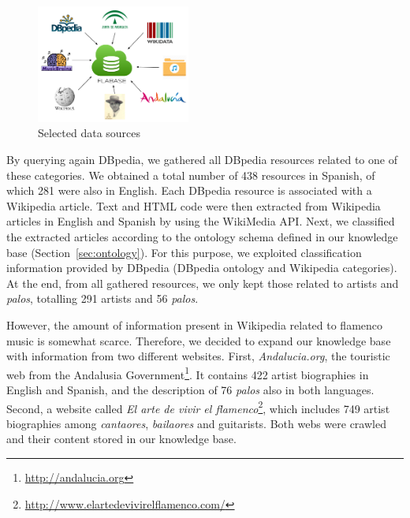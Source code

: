\begin{figure}
	\centering
	\includegraphics[width=0.45\textwidth]{ch08_musicology/pics/datasources.png}
	\caption{Selected data sources \label{fig:datasources}}
\end{figure}

By querying again DBpedia, we gathered all DBpedia resources related to one of these categories. We obtained a total number of 438 resources in Spanish, of which 281 were also in English. Each DBpedia resource is associated with a Wikipedia article. Text and HTML code were then extracted from Wikipedia articles in English and Spanish by using the WikiMedia API. 
Next, we classified the extracted articles according to the ontology schema defined in our knowledge base (Section~\ref{sec:ontology}). For this purpose, we exploited classification information provided by DBpedia (DBpedia ontology and Wikipedia categories). At the end, from all gathered resources, we only kept those related to artists and \textit{palos}, totalling  291 artists and 56 \textit{palos}.

However, the amount of information present in Wikipedia related to flamenco music is somewhat scarce. Therefore, we decided to expand our knowledge base with information from two different websites. First, \textit{Andalucia.org}, the touristic web from the Andalusia Government\footnote{\url{http://andalucia.org}}. It contains 422 artist biographies in English and Spanish, and the description of 76 \textit{palos} also in both languages. Second, a website called \textit{El arte de vivir el flamenco}\footnote{\url{http://www.elartedevivirelflamenco.com/}}, which includes 749 artist biographies among \textit{cantaores}, \textit{bailaores} and guitarists. Both webs were crawled and their content stored in our knowledge base. %

